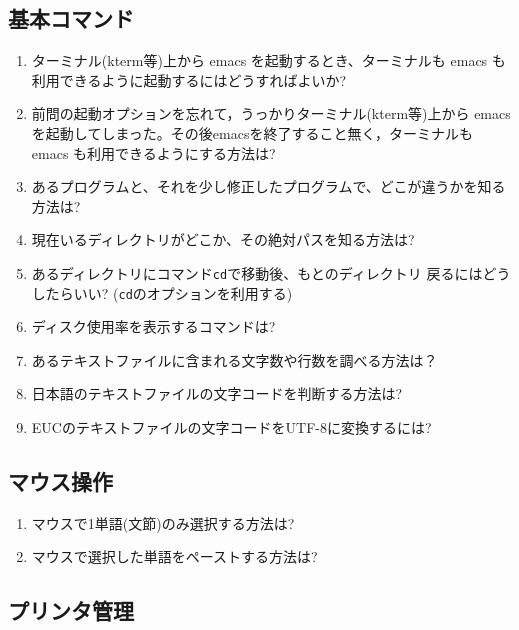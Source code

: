 \documentclass[11pt, twocolumn, ]{jsarticle}
\begin{document}
\hypertarget{ux57faux672cux30b3ux30deux30f3ux30c9}{%
\subsection{基本コマンド}\label{ux57faux672cux30b3ux30deux30f3ux30c9}}

\begin{enumerate}
\item
  ターミナル(kterm等)上から emacs を起動するとき、ターミナルも emacs
  も利用できるように起動するにはどうすればよいか?
\item
  前問の起動オプションを忘れて，うっかりターミナル(kterm等)上から emacs
  を起動してしまった。その後emacsを終了すること無く，ターミナルも emacs
  も利用できるようにする方法は?
\item
  あるプログラムと、それを少し修正したプログラムで、どこが違うかを知る方法は?
\item
  現在いるディレクトリがどこか、その絶対パスを知る方法は?
\item
  あるディレクトリにコマンド\passthrough{\lstinline!cd!}で移動後、もとのディレクトリ
  戻るにはどうしたらいい?
  (\passthrough{\lstinline!cd!}のオプションを利用する)
\item
  ディスク使用率を表示するコマンドは?
\item
  あるテキストファイルに含まれる文字数や行数を調べる方法は？
\item
  日本語のテキストファイルの文字コードを判断する方法は?
\item
  EUCのテキストファイルの文字コードをUTF-8に変換するには?
\end{enumerate}

\hypertarget{ux30deux30a6ux30b9ux64cdux4f5c}{%
\subsection{マウス操作}\label{ux30deux30a6ux30b9ux64cdux4f5c}}

\begin{enumerate}
\item
  マウスで1単語(文節)のみ選択する方法は?
\item
  マウスで選択した単語をペーストする方法は?
\end{enumerate}

\hypertarget{ux30d7ux30eaux30f3ux30bfux7ba1ux7406}{%
\subsection{プリンタ管理}\label{ux30d7ux30eaux30f3ux30bfux7ba1ux7406}}
\end{document}
